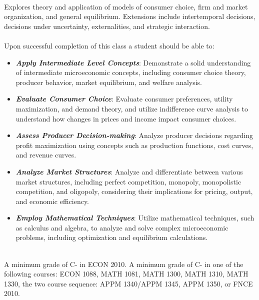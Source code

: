 \documentclass[11pt]{article}
\begin{document}
\\
Explores theory and application of models of consumer choice, firm and market organization, and general equilibrium.  Extensions include intertemporal decisions, decisions under uncertainty, externalities, and strategic interaction.\\

\\
Upon successful completion of this class a student should be able to:
\begin{itemize}
\item {\bf\emph{Apply Intermediate Level Concepts}}:  Demonstrate a solid understanding of intermediate microeconomic concepts, including consumer choice theory, producer behavior, market equilibrium, and welfare analysis.\vspace{-.1in}
\item {\bf\emph{Evaluate Consumer Choice}}:  Evaluate consumer preferences, utility maximization, and demand theory, and utilize indifference curve analysis to understand how changes in prices and income impact consumer choices.\vspace{-.1in}
\item {\bf\emph{Assess Producer Decision-making}}:  Analyze producer decisions regarding profit maximization using concepts such as production functions, cost curves, and revenue curves.\vspace{-.1in}
\item {\bf\emph{Analyze Market Structures}}:  Analyze and differentiate between various market structures, including perfect competition, monopoly, monopolistic competition, and oligopoly, considering their implications for pricing, output, and economic efficiency.\vspace{-.1in} 
\item {\bf\emph{Employ Mathematical Techniques}}:  Utilize mathematical techniques, such as calculus and algebra, to analyze and solve complex microeconomic problems, including optimization and equilibrium calculations.
\end{itemize}

\\
A minimum grade of C- in ECON 2010.  A minimum grade of C- in one of the following courses: ECON 1088, MATH 1081, MATH 1300, MATH 1310, MATH 1330, the two course sequence: APPM 1340/APPM 1345, APPM 1350, or FNCE 2010.\\  
\end{document}
